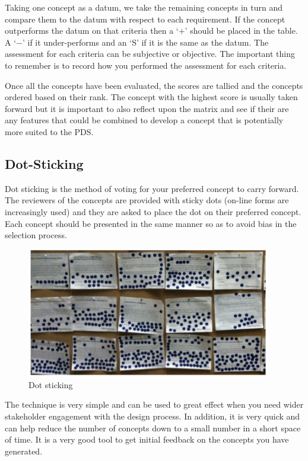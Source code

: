 Taking one concept as a datum, we take the remaining concepts in turn and compare them to the datum with respect to each requirement. If the concept outperforms the datum on that criteria then a `$+$' should be placed in the table. A `$-$' if it under-performs and an `S' if it is the same as the datum. The assessment for each criteria can be subjective or objective. The important thing to remember is to record how you performed the assessment for each criteria.

Once all the concepts have been evaluated, the scores are tallied and the concepts ordered based on their rank. The concept with the highest score is usually taken forward but it is important to also reflect upon the matrix and see if their are any features that could be combined to develop a concept that is potentially more suited to the \ac{PDS}.

\subsection{Dot-Sticking}

Dot sticking  is the method of voting for your preferred concept to carry forward. The reviewers of the concepts are provided with sticky dots (on-line forms are increasingly used) and they are asked to place the dot on their preferred concept. Each concept should be presented in the same manner so as to avoid bias in the selection process.

\begin{figure}[h!]
    \centering
    \includegraphics[width=0.95\textwidth]{06_concept_selection/dot-sticking.png}
    \caption{Dot sticking}
    \label{fig-dot}
\end{figure}

The technique is very simple and can be used to great effect when you need wider stakeholder engagement with the design process. In addition, it is very quick and can help reduce the number of concepts down to a small number in a short space of time. It is a very good tool to get initial feedback on the concepts you have generated.

